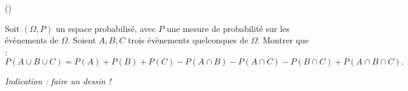 \begin{exercice}\label{exo3-13} (\mortelexo)

Soit $(\Omega, P)$ un espace probabilis\'e, avec $P$ une mesure
de probabilit\'e sur les \'ev\`enements de $\Omega$.
Soient $A,B,C$ trois \'ev\`enements quelconques de $\Omega$. Montrer que :
\[
P(A\cup B\cup C) =
P(A) + P(B) + P(C)
- P(A\cap B) - P(A\cap C) - P(B\cap C)
+ P(A\cap B \cap C).
\]

{\it Indication : faire un dessin !}

\medskip


\end{exercice}
